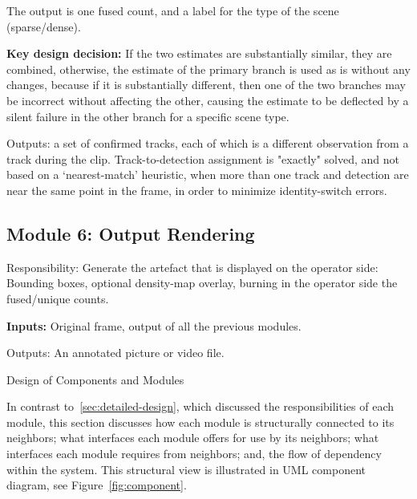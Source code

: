 The output is one fused count, and a label for the type of the scene (sparse/dense).

\textbf{Key design decision:} If the two estimates are substantially similar, they are combined, otherwise, the estimate of the primary branch is used as is without any changes, because if it is substantially different, then one of the two branches may be incorrect without affecting the other, causing the estimate to be deflected by a silent failure in the other branch for a specific scene type.




Outputs: a set of confirmed tracks, each of which is a different observation from a track during the clip. Track-to-detection assignment is "exactly" solved, and not based on a ‘nearest-match’ heuristic, when more than one track and detection are near the same point in the frame, in order to minimize identity-switch errors.

\subsection{Module 6: Output Rendering}

Responsibility: Generate the artefact that is displayed on the operator side: Bounding boxes, optional density-map overlay, burning in the operator side the fused/unique counts.

\textbf{Inputs:} Original frame, output of all the previous modules.

Outputs: An annotated picture or video file.

Design of Components and Modules

In contrast to~\cref{sec:detailed-design}, which discussed the responsibilities of each module, this section discusses how each module is structurally connected to its neighbors; what interfaces each module offers for use by its neighbors; what interfaces each module requires from neighbors; and, the flow of dependency within the system. This structural view is illustrated in UML component diagram, see Figure~\ref{fig:component}.

